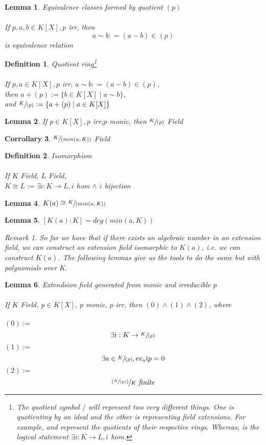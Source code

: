 \documentclass{article}
\theoremstyle{definitionstyle}
\newtheorem{defn}{Definition}[section]
\theoremstyle{lemmastyle}
\newtheorem{lem}{Lemma}[section]
\newtheorem{cor}[lem]{Corrollary}
\theoremstyle{remark}
\newtheorem*{remark}{Remark}
\newcommand{\ibar}{\overline{\imath}}
\begin{document}
\begin{lem}  Equivalence classes formed by quotient $(p)$\\
\\
If $p, a, b \in K[X], p$ irr, then \[a \sim b : = (a - b) \in (p)\] is equivalence relation \end{lem}

\begin{defn} Quotient ring\footnote{The quotient symbol $/$ will represent two very different things. One is quotienting by an ideal and the other is representing field extensions. For example,  and  represent the quotients of their respective rings. Whereas,  is the logical statement $\exists i : K \to L, i$ hom. }\\
\\
If $p, a \in K[X], p$ irr, $a \sim b : = (a - b) \in (p)$,\\

then $a + (p) := \{b \in K[X] \mid a \sim b\}$,\\

and $\sfrac{K}{(p)} := \{a + (p) \mid a \in K[X]\}$
\end{defn}
\begin{lem} If $p \in K[X], p$ irr,$p$ monic, then $\sfrac{K}{(p)}$ Field\end{lem}
\begin{cor} $\sfrac{K}{(min(a,K))}$ Field\end{cor}
\begin{defn} Isomorphism\\
\\
If $K$ Field, $L$ Field,\\

$K \cong L := \exists i : K \to L, i$ hom $\land$ $i$ bijection \end{defn}
\begin{lem} $K(a) \cong \sfrac{K}{(min(a,K))}$\end{lem}
\begin{lem} $[K(a):K]=deg(min(a,K))$
\begin{remark} So far we have that if there exists an algebraic number in an extension field, we can construct an extension field isomorphic to $K(a)$, i.e. we can construct $K(a)$. The following lemmas give us the tools to do the same but with polynomials over $K$. \end{remark}\end{lem}
\begin{lem} Extendsion field generated from monic and irreducible $p$\\
\\
If $K$ Field, $p \in K[X]$, $p$ monic, $p$ irr, then $(0) \land (1) \land (2)$, where\\
\\
$(0) :=$ \[\exists i : K \to \sfrac{K}{(p)}\]
$(1) :=$ \[\exists a \in \sfrac{K}{(p)}, ev_a \ibar p = 0\]
$(2) :=$ \[\sfrac{(\sfrac{K}{(p)})}{K} \textit{  finite}\]
\end{lem}
\end{document}
